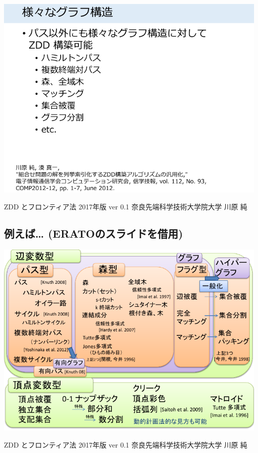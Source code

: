 \includegraphics{img/static/graph.png}

\begin{note}
ZDD とフロンティア法 2017年版 ver 0.1 奈良先端科学技術大学院大学 川原 純
\end{note}

\subsection{例えば\ldots{} (ERATOのスライドを借用)}
\label{sec-6-2}

\includegraphics{img/static/graph2.png}

\begin{note}
ZDD とフロンティア法 2017年版 ver 0.1 奈良先端科学技術大学院大学 川原 純
\end{note}

